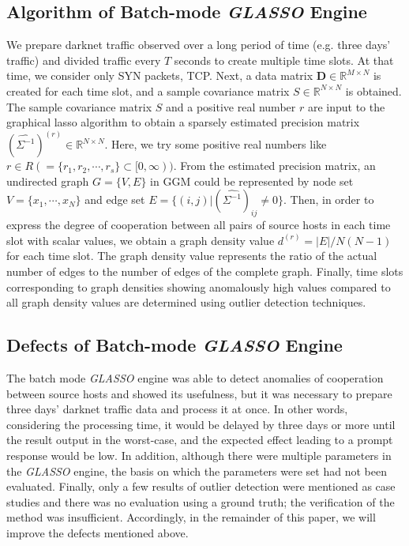 \documentclass[conference]{IEEEtran}
\begin{document}
\subsection{Algorithm of Batch-mode {\it GLASSO} Engine}
We prepare darknet traffic observed over a long period of time (e.g. three days' traffic) and divided traffic every $T$ seconds to create multiple time slots.
At that time, we consider only SYN packets, TCP.
Next, a data matrix $\bm{D}\in\mathbb{R}^{M \times N}$ is created for each time slot, and a sample covariance matrix $S\in\mathbb{R}^{N \times N}$ is obtained.
The sample covariance matrix $S$ and a positive real number $r$ are input to the graphical lasso algorithm to obtain a sparsely estimated precision matrix ${(\hat{\Sigma^{-1}})}^{(r)}\in\mathbb{R}^{N \times N}$.
Here, we try some positive real numbers like $r \in R ( = \{r_1, r_2, \cdots, r_s\} \subset [0,\infty))$.
From the estimated precision matrix, an undirected graph $G = \{V, E\}$ in GGM could be represented by node set $V=\{x_{1}, \cdots, x_{N}\}$ and edge set $E=\{(i,j)|{(\hat{\Sigma^{-1}})}_{ij}\neq0\}$.
Then, in order to express the degree of cooperation between all pairs of source hosts in each time slot with scalar values, we obtain a graph density value $d^{(r)}=|E|/N(N-1)$ for each time slot.
The graph density value represents the ratio of the actual number of edges to the number of edges of the complete graph.
Finally, time slots corresponding to graph densities showing anomalously high values compared to all graph density values are determined using outlier detection techniques.




\subsection{Defects of Batch-mode {\it GLASSO} Engine}
The batch mode {\it GLASSO} engine was able to detect anomalies of cooperation between source hosts and showed its usefulness, but it was necessary to prepare three days' darknet traffic data and process it at once.
In other words, considering the processing time, it would be delayed by three days or more until the result output in the worst-case, and the expected effect leading to a prompt response would be low.
In addition, although there were multiple parameters in the {\it GLASSO} engine, the basis on which the parameters were set had not been evaluated.
Finally, only a few results of outlier detection were mentioned as case studies and there was no evaluation using a ground truth; the verification of the method was insufficient.
Accordingly, in the remainder of this paper, we will improve the defects mentioned above.
\end{document}
